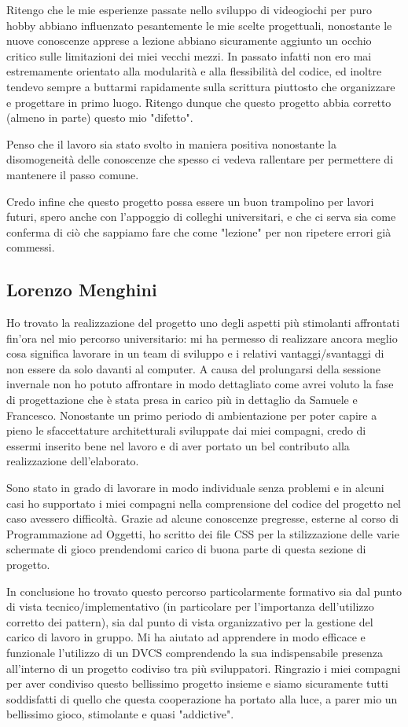 \documentclass[a4paper,12pt]{report}
\begin{document}
Ritengo che le mie esperienze passate nello sviluppo di videogiochi per puro hobby abbiano influenzato pesantemente le mie scelte progettuali, nonostante le nuove conoscenze apprese a lezione abbiano sicuramente aggiunto un occhio critico sulle limitazioni dei miei vecchi mezzi.
In passato infatti non ero mai estremamente orientato alla modularità e alla flessibilità del codice, ed inoltre tendevo sempre a buttarmi rapidamente sulla scrittura piuttosto che organizzare e progettare in primo luogo.
Ritengo dunque che questo progetto abbia corretto (almeno in parte) questo mio "difetto".

Penso che il lavoro sia stato svolto in maniera positiva nonostante la disomogeneità delle conoscenze che spesso ci vedeva rallentare per permettere di mantenere il passo comune.

Credo infine che questo progetto possa essere un buon trampolino per lavori futuri, spero anche con l'appoggio di colleghi universitari, e che ci serva sia come conferma di ciò che sappiamo fare che come "lezione" per non ripetere errori già commessi.

\subsection*{Lorenzo Menghini}
Ho trovato la realizzazione del progetto uno degli aspetti più stimolanti affrontati fin'ora nel mio percorso universitario: mi ha permesso di realizzare ancora meglio cosa significa lavorare in un team di sviluppo e i relativi vantaggi/svantaggi di non essere da solo davanti al computer.
A causa del prolungarsi della sessione invernale non ho potuto affrontare in modo dettagliato come avrei voluto la fase di progettazione che è stata presa in carico più in dettaglio da Samuele e Francesco. Nonostante un primo periodo di ambientazione per poter capire a pieno le sfaccettature architetturali sviluppate dai miei compagni, credo di essermi inserito bene nel lavoro e di aver portato un bel contributo alla realizzazione dell'elaborato.

Sono stato in grado di lavorare in modo individuale senza problemi e in alcuni casi ho supportato i miei compagni nella comprensione del codice del progetto nel caso avessero difficoltà.
Grazie ad alcune conoscenze pregresse, esterne al corso di Programmazione ad Oggetti, ho scritto dei file CSS per la stilizzazione delle varie schermate di gioco prendendomi carico di buona parte di questa sezione di progetto.

In conclusione ho trovato questo percorso particolarmente formativo sia dal punto di vista tecnico/implementativo (in particolare per l'importanza dell'utilizzo corretto dei pattern), sia dal punto di vista organizzativo per la gestione del carico di lavoro in gruppo.
Mi ha aiutato ad apprendere in modo efficace e funzionale l'utilizzo di un DVCS comprendendo la sua indispensabile presenza all'interno di un progetto codiviso tra più sviluppatori.
Ringrazio i miei compagni per aver condiviso questo bellissimo progetto insieme e siamo sicuramente tutti soddisfatti di quello che questa cooperazione ha portato alla luce, a parer mio un bellissimo gioco, stimolante e quasi "addictive". 
\end{document}

